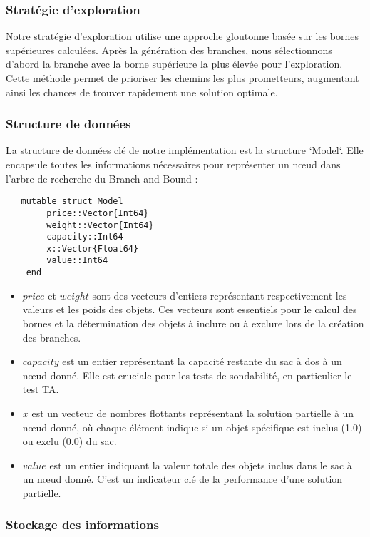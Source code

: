 \subsubsection{Stratégie d'exploration}
Notre stratégie d'exploration utilise une approche gloutonne basée sur les bornes supérieures calculées. Après la génération des branches, nous sélectionnons d'abord la branche avec la borne supérieure la plus élevée pour l'exploration. Cette méthode permet de prioriser les chemins les plus prometteurs, augmentant ainsi les chances de trouver rapidement une solution optimale.

\subsubsection{Structure de données}


La structure de données clé de notre implémentation est la structure `Model`. Elle encapsule toutes les informations nécessaires pour représenter un nœud dans l'arbre de recherche du Branch-and-Bound :


\begin{lstlisting}
   mutable struct Model
        price::Vector{Int64}
        weight::Vector{Int64}
        capacity::Int64
        x::Vector{Float64}
        value::Int64
    end
\end{lstlisting}


\begin{itemize}
        \item $price$ et $weight$ sont des vecteurs d'entiers représentant respectivement les valeurs et les poids des objets. Ces vecteurs sont essentiels pour le calcul des bornes et la détermination des objets à inclure ou à exclure lors de la création des branches. 
        \item $capacity$ est un entier représentant la capacité restante du sac à dos à un nœud donné. Elle est cruciale pour les tests de sondabilité, en particulier le test TA.
        \item $x$ est un vecteur de nombres flottants représentant la solution partielle à un nœud donné, où chaque élément indique si un objet spécifique est inclus (1.0) ou exclu (0.0) du sac.
        \item $value$ est un entier indiquant la valeur totale des objets inclus dans le sac à un nœud donné. C'est un indicateur clé de la performance d'une solution partielle.
\end{itemize}

\subsubsection{Stockage des informations}


